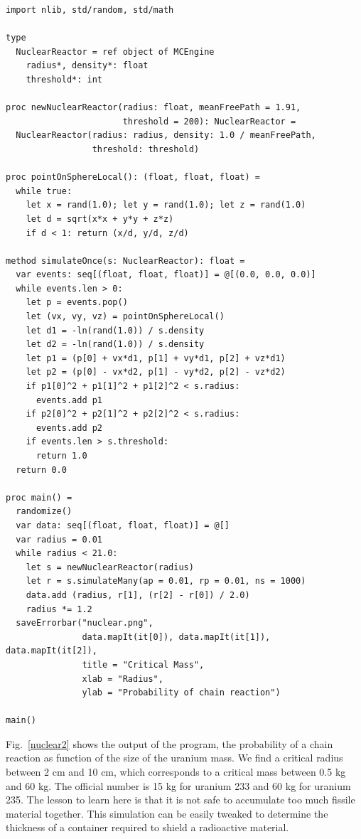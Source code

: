 \documentclass[justified, sixbynine]{tufte-book}
\def\ft{\small\tt}
\theoremstyle{plain}%
\newtheorem * {corollary}{Corollary}
\theoremstyle{definition}
\theoremstyle{remark}
\newtheorem * {remark}{Remark}
\newtheorem * {note}{Note}
\begin{document}
\begin{fullwidth}

\begin{lstlisting}[caption={in file: {\ft nuclear.nim}}]
import nlib, std/random, std/math

type
  NuclearReactor = ref object of MCEngine
    radius*, density*: float
    threshold*: int

proc newNuclearReactor(radius: float, meanFreePath = 1.91,
                       threshold = 200): NuclearReactor =
  NuclearReactor(radius: radius, density: 1.0 / meanFreePath,
                 threshold: threshold)

proc pointOnSphereLocal(): (float, float, float) =
  while true:
    let x = rand(1.0); let y = rand(1.0); let z = rand(1.0)
    let d = sqrt(x*x + y*y + z*z)
    if d < 1: return (x/d, y/d, z/d)

method simulateOnce(s: NuclearReactor): float =
  var events: seq[(float, float, float)] = @[(0.0, 0.0, 0.0)]
  while events.len > 0:
    let p = events.pop()
    let (vx, vy, vz) = pointOnSphereLocal()
    let d1 = -ln(rand(1.0)) / s.density
    let d2 = -ln(rand(1.0)) / s.density
    let p1 = (p[0] + vx*d1, p[1] + vy*d1, p[2] + vz*d1)
    let p2 = (p[0] - vx*d2, p[1] - vy*d2, p[2] - vz*d2)
    if p1[0]^2 + p1[1]^2 + p1[2]^2 < s.radius:
      events.add p1
    if p2[0]^2 + p2[1]^2 + p2[2]^2 < s.radius:
      events.add p2
    if events.len > s.threshold:
      return 1.0
  return 0.0

proc main() =
  randomize()
  var data: seq[(float, float, float)] = @[]
  var radius = 0.01
  while radius < 21.0:
    let s = newNuclearReactor(radius)
    let r = s.simulateMany(ap = 0.01, rp = 0.01, ns = 1000)
    data.add (radius, r[1], (r[2] - r[0]) / 2.0)
    radius *= 1.2
  saveErrorbar("nuclear.png",
               data.mapIt(it[0]), data.mapIt(it[1]), data.mapIt(it[2]),
               title = "Critical Mass",
               xlab = "Radius",
               ylab = "Probability of chain reaction")

main()
\end{lstlisting}

Fig.~\ref{nuclear2} shows the output of the program, the probability of a chain reaction as function of the size of the uranium mass. We find a critical radius between 2 cm and 10 cm, which corresponds to a critical mass between 0.5 kg and 60 kg. The official number is 15 kg for uranium 233 and  60 kg for uranium 235. The lesson to learn here is that it is not safe to accumulate too much fissile material together. This simulation can be easily tweaked to determine the thickness of a container required to shield a radioactive material.


\end{fullwidth}
\end{document}
